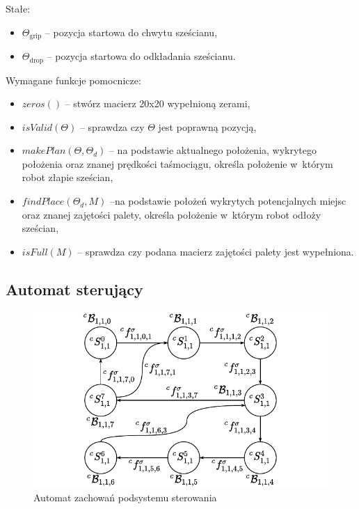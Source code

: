 Stałe:\begin{itemize}
    \item $\Theta_{\mathrm{grip}}$ -- pozycja startowa do chwytu sześcianu, 
    \item $\Theta_{\mathrm{drop}}$ -- pozycja startowa do odkładania sześcianu.
\end{itemize}

Wymagane funkcje pomocnicze:
\begin{itemize}
    \item $zeros()$ -- stwórz macierz 20x20 wypełnioną zerami,
    \item $isValid(\Theta)$ -- sprawdza czy $\Theta$ jest poprawną pozycją,
    \item $makePlan(\Theta, \Theta_{d})$ -- na podstawie aktualnego położenia, wykrytego położenia oraz znanej prędkości taśmociągu, określa położenie w~którym robot złapie sześcian, 
    \item $findPlace(\Theta_{d}, M)$ --na podstawie położeń wykrytych potencjalnych miejsc oraz znanej zajętości palety, określa położenie w~którym robot odłoży sześcian,
    \item $isFull(M)$ -- sprawdza czy podana macierz zajętości palety jest wypełniona.
\end{itemize}

\subsection{Automat sterujący}
\label{subsec:cs-automat}

\begin{figure}[H]
    \centering
    \includegraphics[width=\columnwidth]{figures/ISR-cs-behaviours.pdf}
    \caption{Automat zachowań podsystemu sterowania}
    \label{fig:zachowania-cs}
\end{figure}

